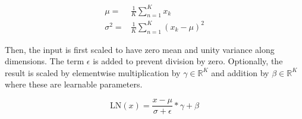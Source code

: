 \begin{equation}
\label{eq:layernorm_statistics}
\begin{split}
\mu = & \frac{1}{K} \sum_{n=1}^{K} x_k \\
\sigma^2 = & \frac{1}{K} \sum_{n=1}^{K} (x_k-\mu)^2
\end{split}
\end{equation} 

Then, the input is first scaled to have zero mean and unity variance along dimensions. The term $\epsilon$ is added to prevent division by zero. Optionally, the result is scaled by elementwise multiplication by $\gamma \in \mathbb{R}^K$ and addition by $\beta \in \mathbb{R}^K$ where these are learnable parameters. 

\begin{equation}
\label{eqn:layernorm}
\mathrm{LN}(x) = \frac{x-\mu}{\sigma+\epsilon} * \gamma + \beta
\end{equation}